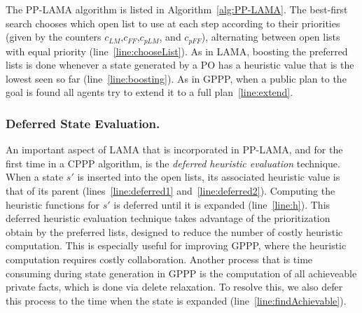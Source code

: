 \documentclass[letterpaper]{article}
\theoremstyle{definition}
\begin{document}

The PP-LAMA algorithm is listed in Algorithm~\ref{alg:PP-LAMA}. The best-first search chooses which open list to use at each step according to their priorities (given by the counters $c_{LM}$,$c_{FF}$,$c_{pLM}$, and $c_{pFF}$), alternating between open lists with equal priority (line~\ref{line:chooseList}). 
As in LAMA, boosting the preferred lists is done whenever a state generated by a PO has a heuristic value that is the lowest seen so far (line~\ref{line:boosting}). As in GPPP, when a public plan to the goal is found all agents try to extend it to a full plan~\ref{line:extend}.

\subsubsection{Deferred State Evaluation.} An important aspect of LAMA that is incorporated in PP-LAMA, and for the first time in a CPPP algorithm, is the {\em deferred heuristic evaluation} technique. When a state $s'$ is inserted into the open lists, its associated heuristic value is that of its parent (lines~\ref{line:deferred1} and~\ref{line:deferred2}). Computing the heuristic functions for $s'$ is deferred until it is expanded (line~\ref{line:h}). This deferred heuristic evaluation technique takes advantage of the prioritization obtain by the preferred lists, designed to reduce the number of costly heuristic computation. This is especially useful for improving GPPP, where the heuristic computation requires costly collaboration. 
Another process that is time consuming during state generation in GPPP is the computation of all achieveable private facts, which is done via delete relaxation. 
To resolve this, we also defer this process to the time when the state is expanded (line~\ref{line:findAchievable}).  
\end{document}
